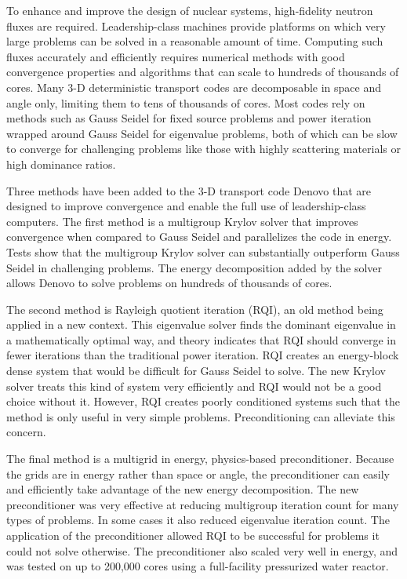 
\noindent       %
To enhance and improve the design of nuclear systems, high-fidelity neutron fluxes are required. Leadership-class machines provide platforms on which very large problems can be solved in a reasonable amount of time. Computing such fluxes accurately and efficiently requires numerical methods with good convergence properties and algorithms that can scale to hundreds of thousands of cores. Many 3-D deterministic transport codes are decomposable in space and angle only, limiting them to tens of thousands of cores. Most codes rely on methods such as Gauss Seidel for fixed source problems and power iteration wrapped around Gauss Seidel for eigenvalue problems, both of which can be slow to converge for challenging problems like those with highly scattering materials or high dominance ratios. 

\vspace*{0.5em}
\noindent       %
Three methods have been added to the 3-D \Sn transport code Denovo that are designed to improve convergence and enable the full use of leadership-class computers. The first method is a multigroup Krylov solver that improves convergence when compared to Gauss Seidel and parallelizes the code in energy. Tests show that the multigroup Krylov solver can substantially outperform Gauss Seidel in challenging problems. The energy decomposition added by the solver allows Denovo to solve problems on hundreds of thousands of cores. 

\vspace*{0.5em}
\noindent       %
The second method is Rayleigh quotient iteration (RQI), an old method being applied in a new context. This eigenvalue solver finds the dominant eigenvalue in a mathematically optimal way, and theory indicates that RQI should converge in fewer iterations than the traditional power iteration. RQI creates an energy-block dense system that would be difficult for Gauss Seidel to solve. The new Krylov solver treats this kind of system very efficiently and RQI would not be a good choice without it. However, RQI creates poorly conditioned systems such that the method is only useful in very simple problems. Preconditioning can alleviate this concern. 

\vspace*{0.5em}
\noindent       %
The final method is a multigrid in energy, physics-based preconditioner. Because the grids are in energy rather than space or angle, the preconditioner can easily and efficiently take advantage of the new energy decomposition. The new preconditioner was very effective at reducing multigroup iteration count for many types of problems. In some cases it also reduced eigenvalue iteration count. The application of the preconditioner allowed RQI to be successful for problems it could not solve otherwise. The preconditioner also scaled very well in energy, and was tested on up to 200,000 cores using a full-facility pressurized water reactor.

